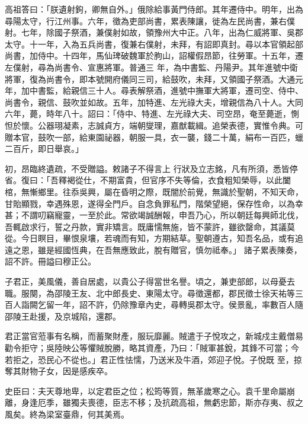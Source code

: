 \begin{pinyinscope}
 高祖答曰：「朕遺射鉤，卿無自外。」俄除給事黃門侍郎。其年遷侍中。明年，出為尋陽太守，行江州事。六年，徵為吏部尚書，累表陳讓，徙為左民尚書，兼右僕射。七年，除國子祭酒，兼僕射如故，領豫州大中正。八年，出為仁威將軍、吳郡太守。十一年，入為五兵尚書，復兼右僕射，未拜，有詔即真封。尋以本官領起部尚書，加侍中。十四年，馬仙琕破魏軍於朐山，詔權假昂節，往勞軍。十五年，遷左僕射，尋為尚書令、宣惠將軍。普通三
 年，為中書監、丹陽尹。其年進號中衛將軍，復為尚書令，即本號開府儀同三司，給鼓吹，未拜，又領國子祭酒。大通元年，加中書監，給親信三十人。尋表解祭酒，進號中撫軍大將軍，遷司空、侍中、尚書令，親信、鼓吹並如故。五年，加特進、左光祿大夫，增親信為八十人。大同六年，薨，時年八十。詔曰：「侍中、特進、左光祿大夫、司空昂，奄至薨逝，惻怛於懷。公器珝凝素，志誠貞方，端朝燮理，嘉猷載緝。追榮表德，實惟令典。可贈本官，鼓吹一部，給東園祕器，朝服一具，衣一襲，錢二十萬，絹布一百匹，蠟二百斤，即日舉哀。」



 初，昂臨終遺疏，不受贈謚。敕諸子不得言上
 行狀及立志銘，凡有所須，悉皆停省。復曰：「吾釋褐從仕，不期富貴，但官序不失等倫，衣食粗知榮辱，以此闔棺，無慚鄉里。往忝吳興，屬在昏明之際，既闇於前覺，無識於聖朝，不知天命，甘貽顯戮，幸遇殊恩，遂得全門戶。自念負罪私門，階榮望絕，保存性命，以為幸甚；不謂叨竊寵靈，一至於此。常欲竭誠酬報，申吾乃心，所以朝廷每興師北伐，吾輒啟求行，誓之丹款，實非矯言。既庸懦無施，皆不蒙許，雖欲罄命，其議莫從。今日瞑目，畢恨泉壤，若魂而有知，方期結草。聖朝遵古，知吾名品，或有追遠之恩，雖是經國恆典，在吾無應致此，脫有贈官，慎勿祗奉。」
 諸子累表陳奏，詔不許。冊謚曰穆正公。



 子君正，美風儀，善自居處，以貴公子得當世名譽。頃之，兼吏部郎，以母憂去職。服闋，為邵陵王友、北中郎長史、東陽太守。尋徵還都，郡民徵士徐天祐等三百人詣闕乞留一年，詔不許，仍除豫章內史，尋轉吳郡太守。侯景亂，率數百人隨邵陵王赴援，及京城陷，還郡。



 君正當官蒞事有名稱，而蓄聚財產，服玩靡麗。賊遣于子悅攻之，新城戍主戴僧易勸令拒守；吳陸映公等懼賊脫勝，略其資產，乃曰：「賊軍甚銳，其鋒不可當；今若拒之，恐民心不從也。」君正性怯懦，乃送米及牛酒，郊迎子悅。子悅既
 至，掠奪其財物子女，因是感疾卒。



 史臣曰：夫天尊地卑，以定君臣之位；松筠等質，無革歲寒之心。袁千里命屬崩離，身逢厄季，雖獨夫喪德，臣志不移；及抗疏高祖，無虧忠節，斯亦存夷、叔之風矣。終為梁室臺鼎，何其美焉。



\end{pinyinscope}